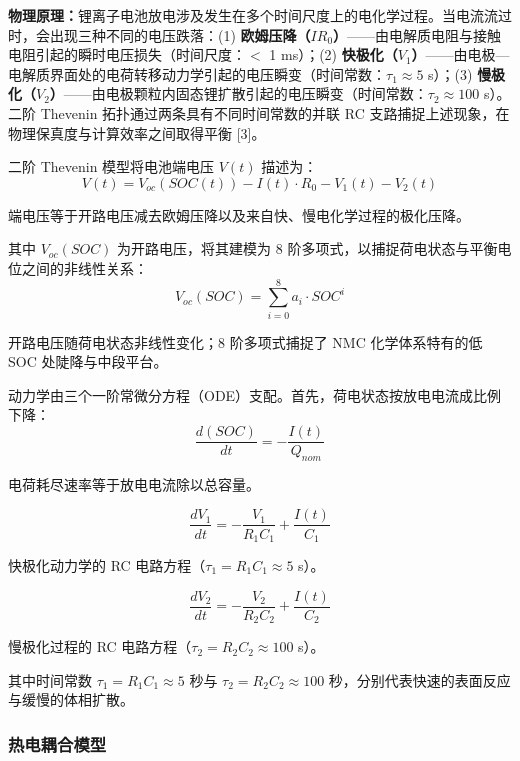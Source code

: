 \documentclass[11pt,a4paper]{ctexart}
\begin{document}
\textbf{物理原理：}锂离子电池放电涉及发生在多个时间尺度上的电化学过程。当电流流过时，会出现三种不同的电压跌落：(1) \textbf{欧姆压降（$IR_0$）}——由电解质电阻与接触电阻引起的瞬时电压损失（时间尺度：$<$ 1 ms）；(2) \textbf{快极化（$V_1$）}——由电极—电解质界面处的电荷转移动力学引起的电压瞬变（时间常数：$\tau_1 \approx 5$ s）；(3) \textbf{慢极化（$V_2$）}——由电极颗粒内固态锂扩散引起的电压瞬变（时间常数：$\tau_2 \approx 100$ s）。二阶 Thevenin 拓扑通过两条具有不同时间常数的并联 RC 支路捕捉上述现象，在物理保真度与计算效率之间取得平衡 [3]。

二阶 Thevenin 模型将电池端电压 $V(t)$ 描述为：
\begin{equation}
V(t) = V_{oc}\left(SOC(t)\right) - I(t)\cdot R_0 - V_1(t) - V_2(t) \tag{1}
\end{equation}

端电压等于开路电压减去欧姆压降以及来自快、慢电化学过程的极化压降。

其中 $V_{oc}(SOC)$ 为开路电压，将其建模为 8 阶多项式，以捕捉荷电状态与平衡电位之间的非线性关系：
\begin{equation}
V_{oc}(SOC) = \sum_{i=0}^{8} a_i \cdot SOC^{i} \tag{2}
\end{equation}

开路电压随荷电状态非线性变化；8 阶多项式捕捉了 NMC 化学体系特有的低 SOC 处陡降与中段平台。

动力学由三个一阶常微分方程（ODE）支配。首先，荷电状态按放电电流成比例下降：
\begin{equation}
\frac{d(SOC)}{dt} = -\frac{I(t)}{Q_{nom}} \tag{3a}
\end{equation}

电荷耗尽速率等于放电电流除以总容量。

\begin{equation}
\frac{dV_1}{dt} = -\frac{V_1}{R_1C_1} + \frac{I(t)}{C_1} \tag{3b}
\end{equation}

快极化动力学的 RC 电路方程（$\tau_1 = R_1C_1 \approx 5$ s）。

\begin{equation}
\frac{dV_2}{dt} = -\frac{V_2}{R_2C_2} + \frac{I(t)}{C_2} \tag{3c}
\end{equation}

慢极化过程的 RC 电路方程（$\tau_2 = R_2C_2 \approx 100$ s）。

其中时间常数 $\tau_1 = R_1C_1 \approx 5$ 秒与 $\tau_2 = R_2C_2 \approx 100$ 秒，分别代表快速的表面反应与缓慢的体相扩散。

\subsubsection{热电耦合模型}
\end{document}
